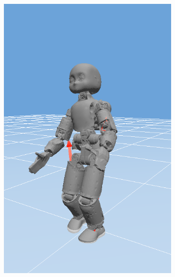 \begin{figure}[t]
\begin{subfigure}[b]{0.32\textwidth}
        \includegraphics[width=\columnwidth]{chapter_compliant_contact/figures/step2.png}
    \end{subfigure}
    \hfill
     \begin{subfigure}[b]{0.32\textwidth}
        \centering

\end{subfigure}
\end{figure}
